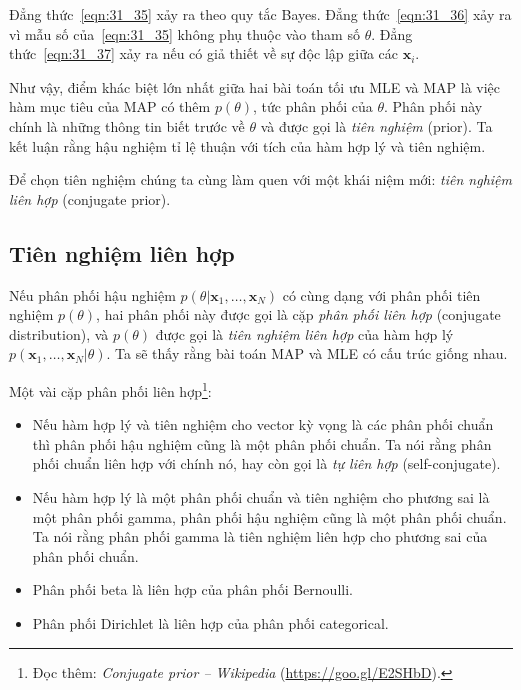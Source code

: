 Đẳng thức~\eqref{eqn:31_35} xảy ra theo quy tắc Bayes. Đẳng
thức~\eqref{eqn:31_36} xảy ra vì mẫu số của~\eqref{eqn:31_35} không phụ thuộc vào
tham số $\theta$. Đẳng thức~\eqref{eqn:31_37} xảy ra nếu có giả thiết về
sự độc lập giữa các $\mathbf{x}_i$. 


Như vậy, điểm khác biệt lớn nhất giữa hai bài toán tối ưu MLE và MAP là việc hàm
mục tiêu của MAP có thêm $p(\theta)$, tức phân phối của $\theta$. Phân phối này
chính là những thông tin biết trước về $\theta$ và được gọi là
\textit{tiên nghiệm} (prior). Ta kết luận rằng hậu nghiệm tỉ lệ thuận với
tích của hàm hợp lý và tiên nghiệm.
 

Để chọn tiên nghiệm chúng ta cùng làm quen với một khái
niệm mới: \textit{tiên nghiệm liên hợp} (conjugate prior). 
 
 
\subsection{Tiên nghiệm liên hợp}
Nếu phân phối hậu nghiệm $p(\theta | \mathbf{x}_1, \dots,
\mathbf{x}_N)$ có cùng dạng với phân phối tiên nghiệm $p(\theta)$, hai phân phối này được gọi là cặp \textit{phân phối liên hợp} (conjugate distribution), và $p(\theta)$ được
gọi là \textit{tiên nghiệm liên hợp} của hàm hợp lý $p(\mathbf{x}_1, \dots,
\mathbf{x}_N | \theta)$. Ta sẽ thấy rằng bài toán MAP và MLE có cấu trúc giống nhau. 
 

Một vài cặp phân phối liên hợp\footnote{Đọc thêm:
\textit{Conjugate prior -- Wikipedia} (\url{https://goo.gl/E2SHbD}).}:

\begin{itemize}
    \item Nếu hàm hợp lý và tiên nghiệm cho vector kỳ vọng là các phân phối
    chuẩn thì phân phối hậu nghiệm cũng là một phân phối chuẩn. Ta nói rằng phân
    phối chuẩn liên hợp với chính nó, hay còn gọi là \textit{tự liên hợp} (self-conjugate).
     
    \item Nếu hàm hợp lý là một phân phối chuẩn và tiên nghiệm
    cho phương sai là một {phân phối gamma}, phân phối hậu nghiệm cũng là một phân phối chuẩn. Ta nói rằng phân phối gamma là tiên nghiệm liên hợp cho phương sai của phân phối chuẩn. 
     
    \item Phân phối beta là liên hợp của phân phối Bernoulli.
     
    \item Phân phối Dirichlet là liên hợp của phân phối categorical.
 
\end{itemize}
 
